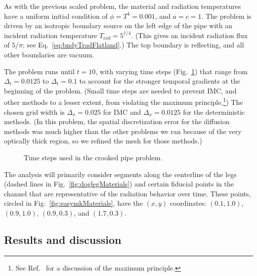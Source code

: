 As with the previous scaled problem, the material and radiation temperatures
have a uniform initial condition of $\phi = T^4 = 0.001$, and $a=c=1$. The
problem is driven by an isotropic boundary source on the left edge of the pipe
with an incident radiation temperature $T_\text{rad} = 5^{1/4}$. (This gives
an incident radiation flux of $5/\pi$; see Eq.~\eqref{eq:bndyTradFlatland}.)
The top boundary is reflecting, and all other boundaries are vacuum.

The problem runs until $t=10$, with varying time steps
(Fig.~\ref{fig:doglegTimestep}) that range from $\Delta_t=0.0125$ to
$\Delta_t=0.1$ to account for the stronger temporal gradients
at the beginning of the problem. (Small time steps are needed
to prevent IMC, and other methods to a lesser extent, from violating the maximum
principle.\footnote{%
See Ref.~\cite{Lar1987} for a discussion of the maximum principle.
})
The chosen grid width is $\Delta_x = 0.025$ for IMC and $\Delta_x = 0.0125$
for the deterministic methods. (In this problem, the spatial discretization
error for the diffusion methods was much higher than the other problems
we ran because of the very optically thick region, so we refined the mesh for
those methods.)

\begin{figure}[htb]
  \centering
  
  \caption{Time steps used in the crooked pipe problem.}
  \label{fig:doglegTimestep}
\end{figure}

The analysis will primarily consider segments along the centerline of the legs
(dashed lines
in Fig.~\ref{fig:doglegMaterials}) and certain fiducial points in the channel
that are representative of the radiation behavior over time. These points,
circled in Fig.~\ref{fig:easymkMaterials}, have the $(x,y)$ coordinates: $(0.1,
1.0)$, $(0.9, 1.0)$, $(0.9, 0.3)$, and $(1.7, 0.3)$.

\subsection{Results and discussion}

